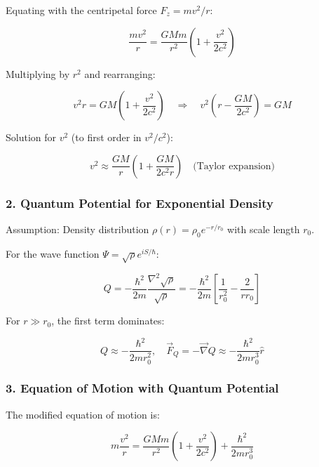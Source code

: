 Equating with the centripetal force $F_z = mv^2/r$:

\begin{equation}
\frac{mv^2}{r} = \frac{GMm}{r^2}\left(1 + \frac{v^2}{2c^2}\right)
\end{equation}

Multiplying by $r^2$ and rearranging:

\begin{equation}
v^2r = GM\left(1 + \frac{v^2}{2c^2}\right) \quad \Rightarrow \quad v^2\left(r - \frac{GM}{2c^2}\right) = GM
\end{equation}

Solution for $v^2$ (to first order in $v^2/c^2$):

\begin{equation}
v^2 \approx \frac{GM}{r}\left(1 + \frac{GM}{2c^2r}\right) \quad \text{(Taylor expansion)}
\end{equation}

\subsubsection{2. Quantum Potential for Exponential Density}
Assumption: Density distribution $\rho(r) = \rho_0 e^{-r/r_0}$ with scale length $r_0$.

For the wave function $\Psi = \sqrt{\rho} e^{iS/\hbar}$:

\begin{equation}
Q = -\frac{\hbar^2}{2m}\frac{\nabla^2\sqrt{\rho}}{\sqrt{\rho}} = -\frac{\hbar^2}{2m}\left[\frac{1}{r_0^2} - \frac{2}{rr_0}\right]
\end{equation}

For $r \gg r_0$, the first term dominates:

\begin{equation}
Q \approx -\frac{\hbar^2}{2m r_0^2}, \quad \vec{F}_Q = -\vec{\nabla}Q \approx -\frac{\hbar^2}{2m r_0^3}\hat{r}
\end{equation}

\subsubsection{3. Equation of Motion with Quantum Potential}
The modified equation of motion is:

\begin{equation}
m\frac{v^2}{r} = \frac{GMm}{r^2}\left(1 + \frac{v^2}{2c^2}\right) + \frac{\hbar^2}{2m r_0^3}
\end{equation}

